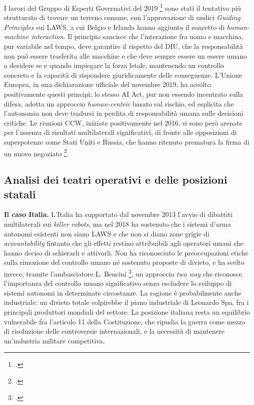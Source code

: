 \documentclass[a4paper,12pt]{report}
\begin{document}
I lavori del Gruppo di Esperti Governativi del 2019 \footcite{ccw_2019} sono
stati il tentativo più strutturato di trovare un terreno comune, con
l'approvazione di undici \textit{Guiding Principles} sui LAWS, a cui Belgio e
Irlanda hanno aggiunto il concetto di \textit{human-machine interaction}. Il
principio sancisce che l'interazione fra uomo e macchina, pur variabile nel
tempo, deve garantire il rispetto del DIU, che la responsabilità non può essere
trasferita alle macchine e che deve sempre essere un essere umano a decidere se
e quando impiegare la forza letale, mantenendo un controllo concreto e la
capacità di rispondere giuridicamente delle conseguenze. L'Unione Europea, in
una dichiarazione ufficiale del novembre 2019, ha accolto positivamente questi
principi; lo stesso AI Act, pur non essendo incentrato sulla difesa, adotta un
approccio \textit{human-centric} basato sul rischio, ed esplicita che
l'autonomia non deve tradursi in perdita di responsabilità umana sulle decisioni
critiche. Le riunioni CCW, iniziate positivamente nel 2016, si sono però arenate
per l'assenza di risultati multilaterali significativi, di fronte alle
opposizioni di superpotenze come Stati Uniti e Russia, che hanno ritenuto
prematura la firma di un nuovo negoziato \footcite{ccw_2019}.
 
\subsection{Analisi dei teatri operativi e delle posizioni statali}
 
\textbf{Il caso Italia.}
L'Italia ha supportato dal novembre 2013 l'avvio di dibattiti multilaterali sui
\textit{killer robots}, ma nel 2018 ha sostenuto che i sistemi d'arma autonomi
esistenti non siano LAWS e che non si diano zone grigie di
\textit{accountability} fintanto che gli effetti restino attribuibili agli
operatori umani che hanno deciso di schierarli e attivarli. Non ha riconosciuto
le preoccupazioni etiche sulla rimozione del controllo umano né sostenuto
proposte di divieto, e ha scelto invece, tramite l'ambasciatore L. Bencini
\footcite[p.~29]{wareham_2020}, un approccio \textit{two way} che riconosce l'importanza
del controllo umano significativo senza escludere lo sviluppo di sistemi
autonomi in determinate circostanze. La ragione è probabilmente anche industriale: un divieto
totale colpirebbe il piano industriale di Leonardo Spa, fra i principali
produttori mondiali del settore. La posizione italiana resta un equilibrio
vulnerabile fra l'articolo 11 della Costituzione, che ripudia la guerra come
mezzo di risoluzione delle controversie internazionali, e la necessità di
mantenere un'industria militare competitiva.
 
\end{document}
